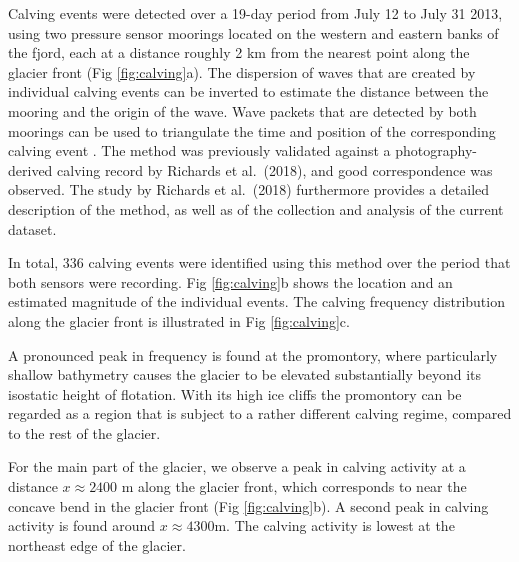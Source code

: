 \documentclass[10pt,letterpaper]{article}
\begin{document}
Calving events were detected over a 19-day period from July 12 to July 31 2013, using two pressure sensor moorings located on the western and eastern banks of the fjord, each at a distance roughly 2 km from the nearest point along the glacier front (Fig \ref{fig:calving}a). The dispersion of waves that are created by individual calving events can be inverted to estimate the distance between the mooring and the origin of the wave. Wave packets that are detected by both moorings can be used to triangulate the time and position of the corresponding calving event \citep{MINOWA:2018et}. The method was previously validated against a photography-derived calving record by Richards et al.~(2018), and good correspondence was observed. The study by Richards et al.~(2018) furthermore provides a detailed description of the method, as well as of the collection and analysis of the current dataset.

In total, 336 calving events were identified using this method over the period that both sensors were recording. Fig \ref{fig:calving}b shows the location and an estimated magnitude of the individual events. The calving frequency distribution along the glacier front is illustrated in Fig \ref{fig:calving}c.

 A pronounced peak in frequency is found at the promontory, where particularly shallow bathymetry causes the glacier to be elevated substantially beyond its isostatic height of flotation. With its high ice cliffs the promontory can be regarded as a region that is subject to a rather different calving regime, compared to the rest of the glacier. 
 
 For the main part of the glacier, we observe a peak in calving activity at a distance  $x \approx 2400$ m along the glacier front, which corresponds to near the concave bend in the glacier front (Fig \ref{fig:calving}b). A second peak in calving activity is found around $x \approx 4300 $m. The calving activity is lowest at the northeast edge of the glacier.
 
\end{document}

